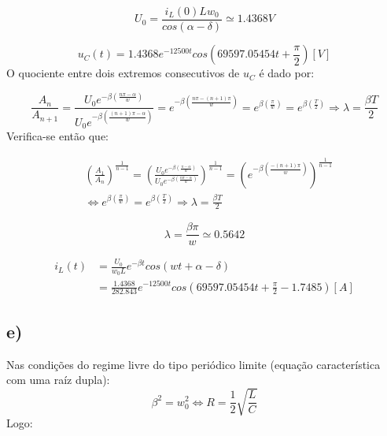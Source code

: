 \begin{equation}
  U_0 = \frac{i_L(0) L w_0}{cos(\alpha - \delta)} \simeq 1.4368 V
\end{equation}

\begin{equation}
  u_C(t) = 1.4368 e^{-12500 t} cos (69597.05454 t + \frac{\pi}{2}) [V]
\end{equation}
O quociente entre dois extremos consecutivos de $u_C$ é dado por:

\begin{equation}
  \frac{A_n}{A_{n+1}} = \frac{U_0 e^{- \beta (\frac{n \pi - \alpha}{w})}}{U_0 e^{- \beta (\frac{(n+1) \pi - \alpha}{w})}} = e^{-\beta(\frac{n \pi - (n+1) \pi}{w})} = e^{\beta (\frac{\pi}{w})} = e^{\beta(\frac{T}{2})} \Rightarrow \lambda = \frac{\beta T}{2}
\end{equation}
Verifica-se então que:

\begin{equation}
  \begin{aligned}
    &(\frac{A_1}{A_{n}})^{\frac{1}{n-1}} = (\frac{U_0 e^{- \beta (\frac{\pi - \alpha}{w})}}{U_0 e^{- \beta (\frac{n \pi - \alpha}{w})}})^{\frac{1}{n-1}} = (e^{-\beta(\frac{- (n+1) \pi}{w})})^{\frac{1}{n-1}}\\ 
    &\Leftrightarrow e^{\beta (\frac{\pi}{w})} = e^{\beta(\frac{T}{2})} \Rightarrow \lambda = \frac{\beta T}{2}
  \end{aligned}
\end{equation}

\begin{equation}
  \lambda = \frac{\beta \pi}{w} \simeq 0.5642
\end{equation}

\begin{equation}
  \begin{aligned}
    i_L(t) &= \frac{U_0}{w_0 L} e^{-\beta t} cos(wt + \alpha - \delta) \\
    &= \frac{1.4368}{282.843} e^{-12500 t} cos(69597.05454 t + \frac{\pi}{2} - 1.7485) [A]
  \end{aligned}
\end{equation}

\subsection*{e)}

Nas condições do regime livre do tipo periódico limite (equação característica com uma raíz dupla):
\begin{equation}
  \beta^2 = w_0^2 \Leftrightarrow R = \frac{1}{2}\sqrt{\frac{L}{C}}
\end{equation}
Logo: 

